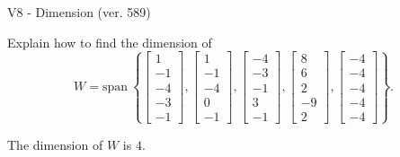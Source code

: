 \begin{exercise}
  \begin{exerciseTitle}V8 - Dimension (ver. 589)\end{exerciseTitle}
  \begin{exerciseStatement}
    Explain how to find the dimension of 
\[W=\mathrm{span}\ \left\{\left[\begin{array}{r}
1 \\
-1 \\
-4 \\
-3 \\
-1
\end{array}\right] , \left[\begin{array}{r}
1 \\
-1 \\
-4 \\
0 \\
-1
\end{array}\right] , \left[\begin{array}{r}
-4 \\
-3 \\
-1 \\
3 \\
-1
\end{array}\right] , \left[\begin{array}{r}
8 \\
6 \\
2 \\
-9 \\
2
\end{array}\right] , \left[\begin{array}{r}
-4 \\
-4 \\
-4 \\
-4 \\
-4
\end{array}\right]\right\}.\]



  \end{exerciseStatement}
  \begin{exerciseAnswer}
   The dimension of \(W\) is  \(4\).
  


  \end{exerciseAnswer}
\end{exercise}